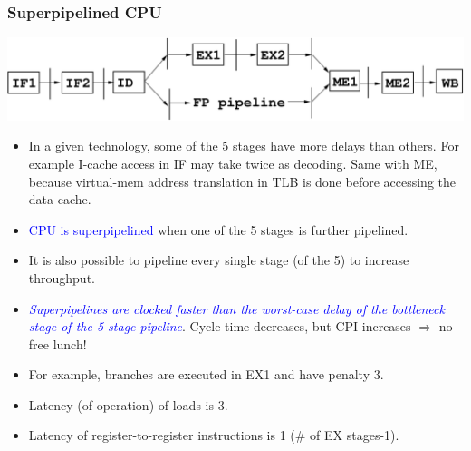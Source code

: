 \documentclass{beamer}
\newcommand{\blue}[1]{\textcolor{Blue}{{#1}}}
\renewcommand{\emph}[1]{\textcolor{structure}{#1}}
\newcommand{\emp}[1]{\textcolor{DikuRed}{ #1}}
\begin{document}
\begin{frame}[fragile,t]
\frametitle{Superpipelined CPU}

\includegraphics[width=59ex]{Figures/SuperPipeline}

\bigskip

\begin{scriptsize}
\begin{itemize}
\item In a given technology, some of the 5 stages have more delays than others.
        For example I-cache access in IF may take twice as decoding.
        Same with ME, because virtual-mem address translation in TLB is 
        done before accessing the data cache.\smallskip

\item \blue{CPU is superpipelined} when one of the 5 stages is further pipelined.\smallskip

\item It is also possible to pipeline every single stage (of the 5) to increase
            throughput.\bigskip

\item \blue{\em Superpipelines are clocked faster than the worst-case delay 
            of the bottleneck stage of the 5-stage pipeline}.
        \emph{Cycle time decreases,} \emp{but CPI increases} 
        $\Rightarrow$ no free lunch!\bigskip

\item For example, branches are executed in EX1 and have penalty 3.
\item Latency (of operation) of loads is 3.
\item Latency of register-to-register instructions is 1 (\# of EX stages-1).
\end{itemize}
\end{scriptsize}
\end{frame}
\end{document}
